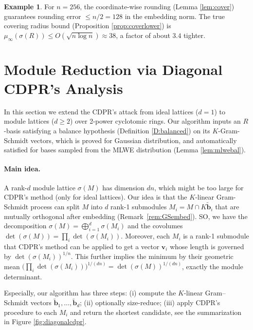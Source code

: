 \documentclass[11pt,a4paper]{article}
\theoremstyle{plain}
\theoremstyle{definition}
\newtheorem{example}[theorem]{Example}
\theoremstyle{remark}
\begin{document}
\begin{example}\label{ex:covergap}
For $n=256$, the coordinate-wise rounding (Lemma \ref{lem:cover}) guarantees rounding error $\le n/2=128$ in the embedding norm. The true covering radius bound (Proposition \ref{prop:coverlower}) is $\mu_\infty(\sigma(R))\le O(\sqrt{n\log n})\approx 38$, a factor of about $3.4$ tighter. 
\end{example}

\section{Module Reduction via Diagonal CDPR's Analysis}\label{sec:twophase}

In this section we extend the CDPR's attack from ideal lattices ($d=1$) to module lattices ($d\ge 2$) over 2-power cyclotomic rings. Our algorithm inputs an $R$-basis satisfying a balance hypothesis (Definition \ref{D:balanced}) on its $K$-Gram-Schmidt vectors, which is proved for Gaussian distribution, and automatically satisfied for bases sampled from the MLWE distribution (Lemma \ref{lem:mlwebal}).

\paragraph{Main idea.} A rank-$d$ module lattice $\sigma(M)$ has dimension $dn$, which might be too large for CDPR's method (only for ideal lattices). Our idea is that the $K$-linear Gram-Schmidt process can split $M$ into $d$ rank-1 submodules $M_i=M\cap K\tilde{\mathbf{b}}_i$ that are mutually orthogonal after embedding (Remark~\ref{rem:GSembed}). SO, we have the decomposition  $\sigma(M)=\bigoplus_{i=1}^d\sigma(M_i)$ and the covolumes $\det(\sigma(M))=\prod_i\det(\sigma(M_i))$. Moreover, each $M_i$ is a rank-1 submodule that CDPR's method can be applied to get a vector $\mathbf{v}_i$ whose length is governed by $\det(\sigma(M_i))^{1/n}$. This further implies the minimum by their geometric mean $\bigl(\prod_i\det(\sigma(M_i))\bigr)^{1/(dn)}=\det(\sigma(M))^{1/(dn)}$, exactly the module determinant. 

Especially, our algorithm has three steps: (i) compute the $K$-linear Gram--Schmidt vectors $\tilde{\mathbf{b}}_1, \dots, \tilde{\mathbf{b}}_d$; (ii) optionally size-reduce; (iii) apply CDPR's procedure to each $M_i$ and return the shortest candidate, see the summarization in Figure \ref{fig:diagonalcdpr}. 
\end{document}
